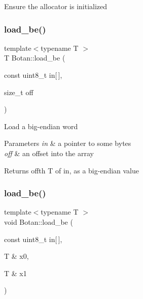 Ensure the allocator is initialized \mbox{\label{namespace_botan_a640029f085cc0a904b32e20f42303dd2}} 
\subsubsection{\texorpdfstring{load\+\_\+be()}{load\_be()}\hspace{0.1cm}{\footnotesize\ttfamily [1/5]}}
{\footnotesize\ttfamily template$<$typename T $>$ \\
T Botan\+::load\+\_\+be (\begin{DoxyParamCaption}\item[{const uint8\+\_\+t}]{in\mbox{[}$\,$\mbox{]},  }\item[{size\+\_\+t}]{off }\end{DoxyParamCaption})\hspace{0.3cm}{\ttfamily [inline]}}

Load a big-\/endian word 
\begin{DoxyParams}{Parameters}
{\em in} & a pointer to some bytes \\
\hline
{\em off} & an offset into the array \\
\hline
\end{DoxyParams}
\begin{DoxyReturn}{Returns}
off\textquotesingle{}th T of in, as a big-\/endian value 
\end{DoxyReturn}
\mbox{\label{namespace_botan_a5773c133cf22abd1269664b59c16244a}} 
\subsubsection{\texorpdfstring{load\+\_\+be()}{load\_be()}\hspace{0.1cm}{\footnotesize\ttfamily [2/5]}}
{\footnotesize\ttfamily template$<$typename T $>$ \\
void Botan\+::load\+\_\+be (\begin{DoxyParamCaption}\item[{const uint8\+\_\+t}]{in\mbox{[}$\,$\mbox{]},  }\item[{T \&}]{x0,  }\item[{T \&}]{x1 }\end{DoxyParamCaption})\hspace{0.3cm}{\ttfamily [inline]}}

